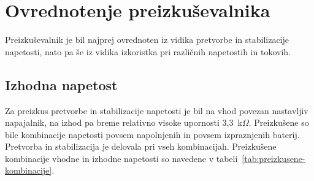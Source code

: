 \documentclass[a4paper,twoside,openright,12pt,slovene]{book}
\begin{document}
\chapter{Ovrednotenje preizkuševalnika}\label{ch:ovrednotenje_preizkusevalnika}
Preizkuševalnik je bil najprej ovrednoten iz vidika pretvorbe in stabilizacije napetosti,
nato pa še iz vidika izkoristka pri različnih napetostih in tokovih.

\section{Izhodna napetost}\label{sec:izhodna-napetost}
Za preizkus pretvorbe in stabilizacije napetosti je bil na vhod povezan nastavljiv napajalnik,
na izhod pa breme relativno visoke upornosti 3,3~k$\Omega$.
Preizkušene so bile kombinacije napetosti povsem napolnjenih in povsem izpraznjenih baterij.
Pretvorba in stabilizacija je delovala pri vseh kombinacijah.
Preizkušene kombinacije vhodne in izhodne napetosti so navedene v tabeli~\ref{tab:preizkusene-kombinacije}.
\end{document}
